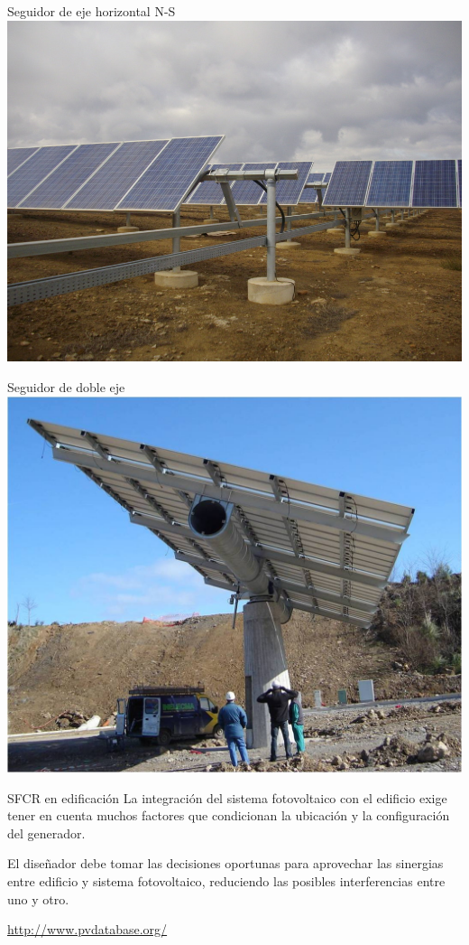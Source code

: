 \documentclass[xcolor={usenames,svgnames,dvipsnames}]{beamer}
\begin{document}
\begin{frame}[label=sec-1-0-10]{Seguidor de eje horizontal N-S}
\includegraphics[width=.9\linewidth]{../figs/SeguidorEjeHorizontal.jpg}
\end{frame}


\begin{frame}[label=sec-1-0-11]{Seguidor de doble eje}
\includegraphics[width=.9\linewidth]{../figs/SeguidorReocin.jpg}
\end{frame}

\begin{frame}[label=sec-1-0-12]{SFCR en edificación}
La integración del sistema fotovoltaico con el edificio exige tener en
cuenta muchos factores que condicionan la ubicación y la configuración
del generador.

El diseñador debe tomar las decisiones oportunas para \alert{aprovechar las
sinergias entre edificio y sistema fotovoltaico}, reduciendo las
posibles interferencias entre uno y otro.

\url{http://www.pvdatabase.org/}
\end{frame}
\end{document}
